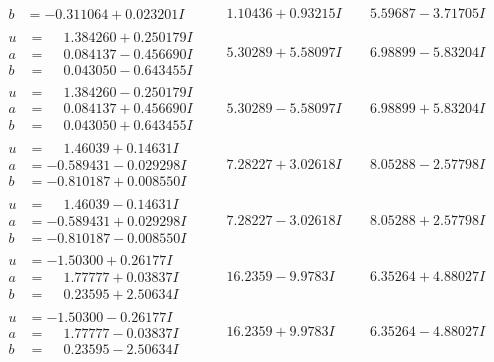 \documentclass[1p]{elsarticle_modified}
\theoremstyle{definition}
\begin{document}
$$\begin{array}{c|c|c}
\begin{aligned}
b &= -0.311064 + 0.023201 I\end{aligned}
 & \phantom{-}1.10436 + 0.93215 I & \phantom{-}5.59687 - 3.71705 I \\ \hline\begin{aligned}
u &= \phantom{-}1.384260 + 0.250179 I \\
a &= \phantom{-}0.084137 - 0.456690 I \\
b &= \phantom{-}0.043050 - 0.643455 I\end{aligned}
 & \phantom{-}5.30289 + 5.58097 I & \phantom{-}6.98899 - 5.83204 I \\ \hline\begin{aligned}
u &= \phantom{-}1.384260 - 0.250179 I \\
a &= \phantom{-}0.084137 + 0.456690 I \\
b &= \phantom{-}0.043050 + 0.643455 I\end{aligned}
 & \phantom{-}5.30289 - 5.58097 I & \phantom{-}6.98899 + 5.83204 I \\ \hline\begin{aligned}
u &= \phantom{-}1.46039 + 0.14631 I \\
a &= -0.589431 - 0.029298 I \\
b &= -0.810187 + 0.008550 I\end{aligned}
 & \phantom{-}7.28227 + 3.02618 I & \phantom{-}8.05288 - 2.57798 I \\ \hline\begin{aligned}
u &= \phantom{-}1.46039 - 0.14631 I \\
a &= -0.589431 + 0.029298 I \\
b &= -0.810187 - 0.008550 I\end{aligned}
 & \phantom{-}7.28227 - 3.02618 I & \phantom{-}8.05288 + 2.57798 I \\ \hline\begin{aligned}
u &= -1.50300 + 0.26177 I \\
a &= \phantom{-}1.77777 + 0.03837 I \\
b &= \phantom{-}0.23595 + 2.50634 I\end{aligned}
 & \phantom{-}16.2359 - 9.9783 I & \phantom{-}6.35264 + 4.88027 I \\ \hline\begin{aligned}
u &= -1.50300 - 0.26177 I \\
a &= \phantom{-}1.77777 - 0.03837 I \\
b &= \phantom{-}0.23595 - 2.50634 I\end{aligned}
 & \phantom{-}16.2359 + 9.9783 I & \phantom{-}6.35264 - 4.88027 I \\ \hline\begin{aligned}

\end{aligned}
\end{array}$$
\end{document}
